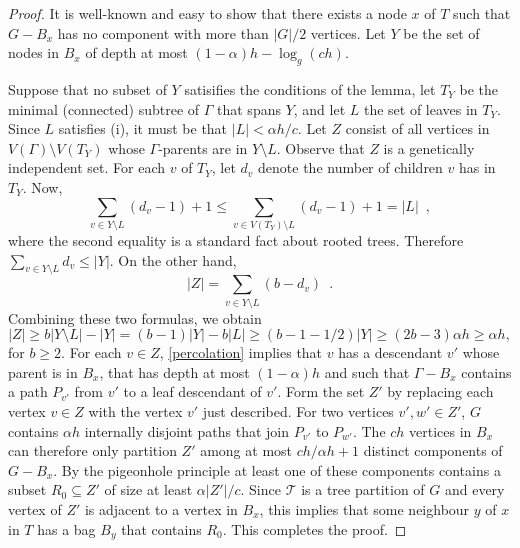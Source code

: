 \documentclass{patmorin}
\begin{document}
\begin{proof}
  It is well-known and easy to show that there exists a node $x$ of $T$ such that $G-B_x$ has no component with more than $|G|/2$ vertices.  Let $Y$ be the set of nodes in $B_x$ of depth at most $(1-\alpha)h-\log_g(ch)$. 


  Suppose that no subset of $Y$ satisifies the conditions of the lemma, let $T_Y$ be the minimal (connected) subtree of $\Gamma$ that spans $Y$, and let $L$ the set of leaves in $T_Y$.  Since $L$ satisfies (i), it must be that $|L|<\alpha h/c$.  Let $Z$ consist of all vertices in $V(\Gamma)\setminus V(T_Y)$ whose $\Gamma$-parents are in $Y\setminus L$.   Observe that $Z$ is a genetically independent set. For each $v$ of $T_Y$, let $d_v$ denote the number of children $v$ has in $T_Y$.  Now,
  \[
     \sum_{v\in Y\setminus L} (d_v-1) + 1 
     \le \sum_{v\in V(T_Y)\setminus L} (d_v-1)+1
     = |L| \enspace ,
  \]
  where the second equality is a standard fact about rooted trees.
  Therefore $\sum_{v\in Y\setminus L} {d_v} \le |Y|$.  On the other hand,
  \[
    |Z| = \sum_{v\in Y\setminus L} (b-d_v) \enspace .
  \]
  Combining these two formulas, we obtain
  \[
    |Z| \ge b|Y\setminus L| - |Y| = (b-1)|Y| - b|L| \ge (b-1-1/2)|Y|
    \ge (2b - 3)\alpha h \ge \alpha h ,
  \]
  for $b\ge 2$.
  For each $v\in Z$, \cref{percolation} implies that $v$ has a descendant $v'$ whose parent is in $B_x$, that has depth at most $(1-\alpha)h$ and such that $\Gamma-B_x$ contains a path $P_{v'}$ from $v'$ to a leaf descendant of $v'$.  Form the set $Z'$ by replacing each vertex $v\in Z$ with the vertex $v'$ just described.  For two vertices $v',w'\in Z'$, $G$ contains $\alpha h$ internally disjoint paths that join $P_{v'}$ to $P_{w'}$.  The $ch$ vertices in $B_x$ can therefore only partition $Z'$ among at most $ch/\alpha h+1$ distinct components of $G-B_x$.  By the pigeonhole principle at least one of these components contains a subset $R_0\subseteq Z'$ of size at least $\alpha|Z'|/c$. Since $\mathcal{T}$ is a tree partition of $G$ and every vertex of $Z'$ is adjacent to a vertex in $B_x$, this implies that some neighbour $y$ of $x$ in $T$ has a bag $B_y$ that contains $R_0$.  This completes the proof.
\end{proof}
\end{document}
